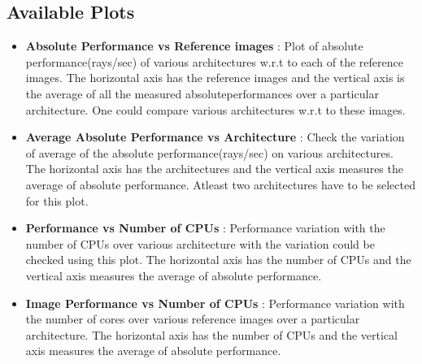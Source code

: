 \documentclass[a4paper,12pt, titlepage]{article}
\begin{document}
\subsection{Available Plots}
\begin{itemize}
\item {\bf Absolute Performance vs Reference images} : Plot of absolute performance(rays/sec) of various architectures w.r.t to each of the reference images. The horizontal axis has the reference images and the vertical axis is the average of all the measured absoluteperformances over a particular architecture. One could compare various architectures w.r.t to these images.
\item {\bf Average Absolute Performance vs Architecture} : Check the variation of average of the absolute performance(rays/sec) on various architectures. The
  horizontal axis has the architectures and the vertical axis measures the average of absolute performance. Atleast two architectures have to be selected for this plot.  
\item {\bf Performance vs Number of CPUs} : Performance variation with the number of CPUs over various architecture with the variation could be checked using this plot. The horizontal axis has the number of CPUs and the vertical axis measures the average of absolute performance. 
\item {\bf Image Performance vs Number of CPUs} : Performance variation with the number of cores over various reference images over a particular architecture. The horizontal axis has the number of CPUs and the vertical axis measures the average of absolute performance.
\end{itemize}
\end{document}
